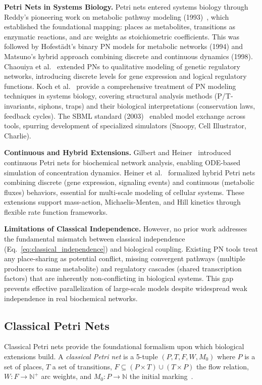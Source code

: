 \documentclass[twocolumn,11pt]{article}
\begin{document}
\textbf{Petri Nets in Systems Biology.} Petri nets entered systems biology through Reddy's pioneering work on metabolic pathway modeling (1993)~\cite{Reddy1993}, which established the foundational mapping: places as metabolites, transitions as enzymatic reactions, and arc weights as stoichiometric coefficients. This was followed by Hofestädt's binary PN models for metabolic networks (1994) and Matsuno's hybrid approach combining discrete and continuous dynamics (1998). Chaouiya et al.~\cite{Chaouiya2007,Chaouiya2006} extended PNs to qualitative modeling of genetic regulatory networks, introducing discrete levels for gene expression and logical regulatory functions. Koch et al.~\cite{Koch2011} provide a comprehensive treatment of PN modeling techniques in systems biology, covering structural analysis methods (P/T-invariants, siphons, traps) and their biological interpretations (conservation laws, feedback cycles). The SBML standard (2003)~\cite{Hucka2003} enabled model exchange across tools, spurring development of specialized simulators (Snoopy, Cell Illustrator, Charlie).

\textbf{Continuous and Hybrid Extensions.} Gilbert and Heiner~\cite{Gilbert2006} introduced continuous Petri nets for biochemical network analysis, enabling ODE-based simulation of concentration dynamics. Heiner et al.~\cite{Heiner2008} formalized hybrid Petri nets combining discrete (gene expression, signaling events) and continuous (metabolic fluxes) behaviors, essential for multi-scale modeling of cellular systems. These extensions support mass-action, Michaelis-Menten, and Hill kinetics through flexible rate function frameworks.

\textbf{Limitations of Classical Independence.} However, no prior work addresses the fundamental mismatch between classical independence (Eq.~\ref{eq:classical_independence}) and biological coupling. Existing PN tools treat any place-sharing as potential conflict, missing convergent pathways (multiple producers to same metabolite) and regulatory cascades (shared transcription factors) that are inherently non-conflicting in biological systems. This gap prevents effective parallelization of large-scale models despite widespread weak independence in real biochemical networks.

\subsection{Classical Petri Nets}

Classical Petri nets provide the foundational formalism upon which biological extensions build. A \emph{classical Petri net} is a 5-tuple $(P, T, F, W, M_0)$ where $P$ is a set of places, $T$ a set of transitions, $F \subseteq (P \times T) \cup (T \times P)$ the flow relation, $W: F \to \mathbb{N}^+$ arc weights, and $M_0: P \to \mathbb{N}$ the initial marking~\cite{Murata1989}.
\end{document}
